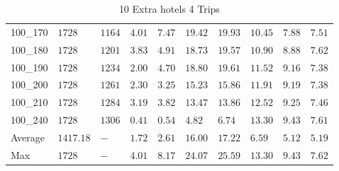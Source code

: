 \begin{center}
\begin{table}[]
\begin{tabular}{|lll|l|l|ll|lll|}
100\_170& $1728   $& $1164$ & $4.01$ & $7.47$   & $19.42$    & $19.93$   & $10.45$& $7.88$   & $7.51$ \\
100\_180& $1728   $& $1201$ & $3.83$ & $4.91$   & $18.73$    & $19.57$   & $10.90$& $8.88$   & $7.62$ \\
100\_190& $1728   $& $1234$ & $2.00$ & $4.70$   & $18.80$    & $19.61$   & $11.52$& $9.16$   & $7.38$ \\
100\_200& $1728   $& $1261$ & $2.30$ & $3.25$   & $15.23$    & $15.86$   & $11.91$& $9.19$   & $7.38$ \\
100\_210& $1728   $& $1284$ & $3.19$ & $3.82$   & $13.47$    & $13.86$   & $12.52$& $9.25$   & $7.46$ \\
100\_240& $1728   $& $1306$ & $0.41$ & $0.54$   & $4.82$    & $6.74$   & $13.30$& $9.43$   & $7.61$ \\
\hline
Average & $1417.18$& $-   $ & $1.72$ & $2.61$   & $16.00$    & $17.22$   & $6.59 $& $5.12$   & $5.19$ \\
Max     & $1728   $& $-   $ & $4.01$ & $8.17$   & $24.07$    & $25.59$   & $13.30$& $9.43$   & $7.62$ \\
\hline
\end{tabular}
\caption{10 Extra hotels 4 Trips}
\label{10-4}
\end{table}
\end{center}
